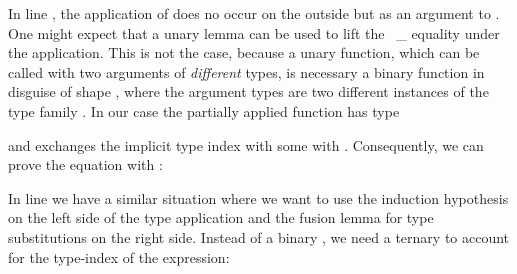\documentclass[acmsmall,anonymous,review,screen]{acmart}
\begin{document}
In line , the application of {} does no occur on the outside but as an argument to
. One might expect that a unary {} lemma can be used to
lift the {~\_} equality under the application.
This is not the case, because a unary function, which can be called with two arguments of
\emph{different} types, is necessary a binary function in disguise of shape
, where the argument types are two different instances
of the type family . In our case the partially applied function 
has type
\begin{quote}
\end{quote}
and {} exchanges the implicit type index  with
some  with .
Consequently, we can prove the equation with {}:
\SubstExamplesFusionESubESubHetProofA



In line  we have a similar situation where we want to use the
induction hypothesis on the left side of the type application and the
fusion lemma for type substitutions on the right side.  Instead of a
binary {}, we need a ternary {} to account
for the type-index of the expression:
\SubstExamplesFusionESubESubHetProofC
\end{document}
